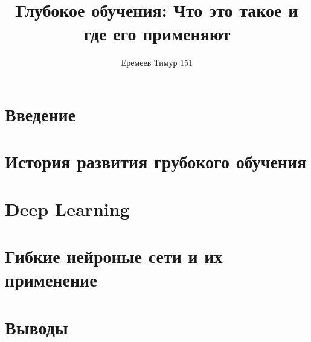 \documentclass[a4paper, 12pt]{article}
\begin{document}
    \title{Глубокое обучения: Что это такое и где его применяют}
    \author{Еремеев Тимур 151}
    \date{}

    \maketitle


    \section*{Введение}    
    

    \section*{История развития грубокого обучения}
    

    \section*{Deep Learning}
    

    \section*{Гибкие нейроные сети и их применение}
    

    \section*{Выводы}
    
\end{document}
